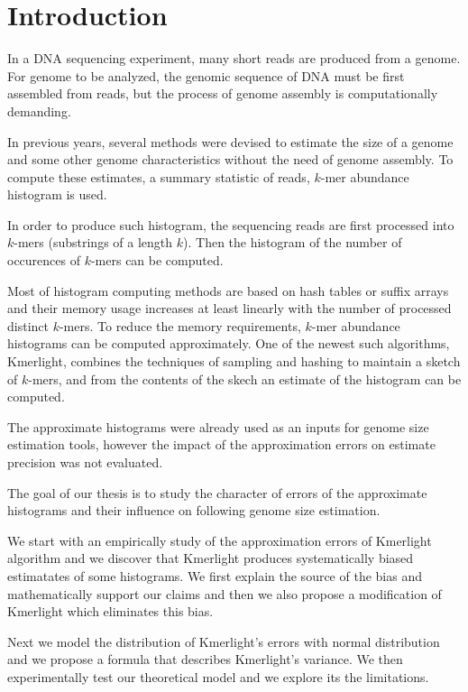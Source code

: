 \chapter*{Introduction}

In a DNA sequencing experiment, many short reads are produced from a genome.
For genome to be analyzed, the genomic sequence of DNA must be first assembled from reads,
but the process of genome assembly is computationally demanding.

In previous years, several methods were devised to estimate
the size of a genome and some other genome characteristics
without the need of genome assembly. To compute these estimates,
a summary statistic of reads, $k$-mer abundance histogram is used.

In order to produce such histogram, the sequencing reads are first processed into $k$-mers 
(substrings of a length $k$). Then the histogram of the number of occurences of $k$-mers
can be computed. 

Most of histogram computing methods are based on hash tables or suffix arrays and
their memory usage increases at least linearly with the number of processed distinct $k$-mers. 
To reduce the memory requirements, $k$-mer abundance histograms can be computed approximately.
One of the newest such algorithms, Kmerlight, combines the techniques of sampling and hashing
to maintain a sketch of $k$-mers, and from the contents of the skech an estimate of the histogram
can be computed.

The approximate histograms were already used as an inputs for genome size estimation tools,
however the impact of the approximation errors on estimate precision was not evaluated.

\medskip

The goal of our thesis is to study the character of errors of the approximate histograms
and their influence on following genome size estimation.

We start with an empirically study of the approximation errors of Kmerlight algorithm and
we discover that Kmerlight produces systematically biased estimatates of some histograms.
We first explain the source of the bias and mathematically support our claims and then
we also propose a modification of Kmerlight which eliminates this bias.

Next we model the distribution of Kmerlight's errors with normal distribution
and we propose a formula that describes Kmerlight's variance. We then experimentally test
our theoretical model and we explore its the limitations.

